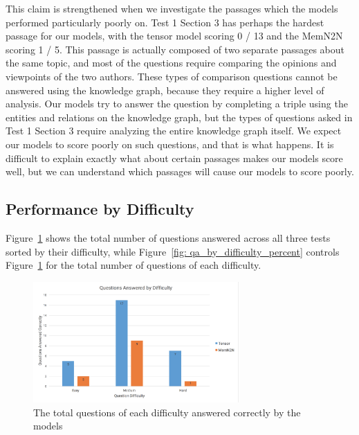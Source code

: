 \documentclass[pageno]{final_paper}
\begin{document}
This claim is strengthened when we investigate the passages which the models
performed particularly poorly on. Test 1 Section 3 has perhaps the hardest
passage for our models, with the tensor model scoring 0 / 13 and the MemN2N
scoring 1 / 5. This passage is actually composed of two separate passages about
the same topic, and most of the questions require comparing the opinions and
viewpoints of the two authors. These types of comparison questions cannot be
answered using the knowledge graph, because they require a higher level of
analysis. Our models try to answer the question by completing a triple using the
entities and relations on the knowledge graph, but the types of questions asked
in Test 1 Section 3 require analyzing the entire knowledge graph itself. We
expect our models to score poorly on such questions, and that is what happens.
It is difficult to explain exactly what about certain passages makes our models
score well, but we can understand which passages will cause our models to score
poorly.

\subsection{Performance by Difficulty}
\label{Performance by Difficulty}

Figure~\ref{fig: qa_by_difficulty} shows the total number of questions answered
across all three tests sorted by their difficulty, while Figure~\ref{fig:
qa_by_difficulty_percent} controls Figure~\ref{fig: qa_by_difficulty} for the
total number of questions of each difficulty.

\begin{figure}[!tb]
    \centering
    \includegraphics[width=0.7\textwidth,keepaspectratio]{figures/qa_by_difficulty.png}
    \caption{The total questions of each difficulty answered correctly by the models}
    \label{fig: qa_by_difficulty}
\end{figure}
\end{document}

